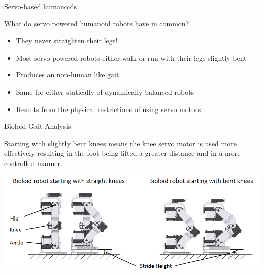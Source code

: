 \documentclass[compress]{beamer}
\begin{document}
\begin{frame}{Servo-based humanoids}

    What do servo powered humanoid robots have in common?

    \begin{itemize}

        \item They never straighten their legs!
        \item Most servo powered robots either walk or run with their legs slightly
            bent
        \item Produces an non-human like gait
        \item Same for either statically of dynamically balanced robots
        \item Results from the physical restrictions of using servo motors
    \end{itemize}

\end{frame}

\begin{frame}{Bioloid Gait Analysis}

    Starting with slightly bent knees means the knee servo motor is used
    more effectively resulting in the foot being lifted a greater distance
    and in a more controlled manner.

    \begin{center}
        \includegraphics[width=\linewidth]{image35}
    \end{center}
\end{frame}
\end{document}

